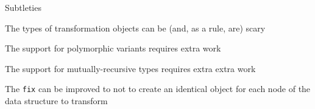 \documentclass{beamer}
\theoremstyle{definition}
\theoremstyle{plain} %
\begin{document}
\begin{comment}
  We swept a number of subtleties under the carpet:

  1. The types of transformation classes/objects can be verbose and scary; it is rather easy to get type parameters
  wrong, especially for the first few times; the right skill comes later. However, as long as only predefined
  transformations are used, an end-user never touches the object level.

  2. The described scheme has to be elaborated further to work with polymorphic variants.

  3. The support for extensibility in mutually-recursive case is even more complicated (but doable, and done). 

  4. A naive implementation of \lstinline|fix| creates a transformation object per recursive call; this can be avoided.  
\end{comment}

\begin{frame}[fragile]{Subtleties}
  
  The types of transformation objects can be (and, as a rule, are) scary 
  \vskip5mm

  The support for polymorphic variants requires extra work
  \vskip5mm

  The support for mutually-recursive types requires extra extra work
  \vskip5mm

  The \lstinline[basicstyle=\large]|fix| can be improved to not to create an identical object for each
  node of the data structure to transform
\end{frame}

\end{document}
